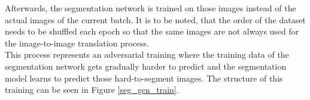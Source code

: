 Afterwards, the segmentation network is trained on those images instead of the actual images of the current batch.
It is to be noted, that the order of the dataset needs to be shuffled each epoch so that the same images are not always used for the image-to-image translation process.\\
This process represents an adversarial training where the training data of the segmentation network gets gradually harder to predict and the segmentation model learns to predict those hard-to-segment images.
The structure of this training can be seen in Figure \ref{seg_gen_train}.


